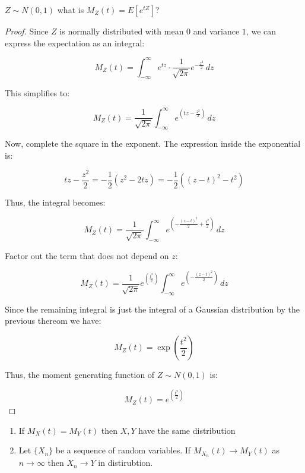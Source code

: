 \documentclass[a4paper]{article}
\begin{document}
\begin{prop}
  $Z \sim N(0,1)$ what is  $M_{Z}(t) = E[e^{tZ}]$?

  \begin{proof}
    
Since $Z$ is normally distributed with mean $0$ and variance $1$, we can express the expectation as an integral:

\[
M_Z(t) = \int_{-\infty}^{\infty} e^{tz} \cdot \frac{1}{\sqrt{2\pi}} e^{-\frac{z^2}{2}} \, dz
\]

This simplifies to:

\[
  M_Z(t) = \frac{1}{\sqrt{2\pi}} \int_{-\infty}^{\infty} e^{\left(tz - \frac{z^2}{2}\right)} \, dz
\]

Now, complete the square in the exponent. The expression inside the exponential is:

\[
tz - \frac{z^2}{2} = -\frac{1}{2}\left(z^2 - 2tz\right) = -\frac{1}{2}\left((z - t)^2 - t^2\right)
\]

Thus, the integral becomes:

\[
  M_Z(t) = \frac{1}{\sqrt{2\pi}} \int_{-\infty}^{\infty} e^{\left(-\frac{(z-t)^2}{2} + \frac{t^2}{2}\right)} \, dz
\]

Factor out the term that does not depend on $z$:

\[
  M_Z(t) = \frac{1}{\sqrt{2\pi}} e^{\left(\frac{t^2}{2}\right)} \int_{-\infty}^{\infty} e^{\left(-\frac{(z-t)^2}{2}\right)} \, dz
\]

Since the remaining integral is just the integral of a Gaussian distribution by the previous thereom we have:

\[
M_Z(t) = \exp\left(\frac{t^2}{2}\right)
\]

Thus, the moment generating function of $Z \sim N(0,1)$ is:

\[
  M_Z(t) = e^{\left(\frac{t^2}{2}\right)}
\]
  \end{proof}
\end{prop}

\begin{theorem}
  \begin{enumerate}
    \item If $M_X(t) = M_{Y}(t)$ then $X,Y$ have the same distribution 
    \item Let  $\{X_n\} $ be a sequence of random variables. If $M_{X_n}(t) \to M_Y(t)$ as $n \to \infty$ then  $X_n \to Y$ in distirubtion. 
  \end{enumerate}
\end{theorem}
\end{document}
